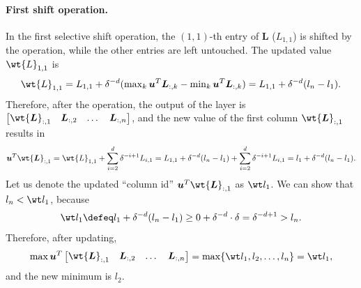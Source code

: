 \documentclass{article} %
\def\vu{{\bm{u}}}
\def\mL{{\bm{L}}}
\def\emL{{L}}
\begin{document}
\paragraph{First shift operation.}
In the first selective shift operation, the $(1,1)$-th entry of $\mL$ ($\emL_{1,1}$) is shifted by the operation, while the other entries are left untouched. The updated value $\wt \emL_{1,1}$ is
\begin{align*}
    \wt \emL_{1,1} 
    = \emL_{1,1} + \delta^{-d} (\max\nolimits_k \vu^T \mL_{:,k} - \min\nolimits_k \vu^T \mL_{:,k}) 
    = \emL_{1,1} + \delta^{-d} (l_n - l_1).
\end{align*}
Therefore, after the operation, the output of the layer is $\begin{bmatrix} \wt \mL_{:,1} & \mL_{:,2} & \dots & \mL_{:,n} \end{bmatrix}$, and the new value of the first column $\wt \mL_{:,1}$ results in
\begin{align*}
    \vu^T \wt \mL_{:,1}
    = \wt \emL_{1,1} + \sum_{i=2}^d \delta^{-i+1} \emL_{i,1}
    = \emL_{1,1} + \delta^{-d} (l_n - l_1) + \sum_{i=2}^d \delta^{-i+1} \emL_{i,1}
    = l_1 + \delta^{-d} (l_n - l_1).
\end{align*}
Let us denote the updated ``column id'' $\vu^T \wt \mL_{:,1}$ as $\wt l_1$.
We can show that $l_n < \wt l_1$, because
\begin{align*}
    \wt l_1 \defeq l_1 + \delta^{-d} (l_n - l_1)
    \geq 0 + \delta^{-d} \cdot \delta
    = \delta^{-d + 1} > l_n.
\end{align*}
Therefore, after updating, 
\begin{equation*}
    \max \vu^T \begin{bmatrix} \wt \mL_{:,1} & \mL_{:,2} & \dots & \mL_{:,n} \end{bmatrix}
    = \max \{ \wt l_1, l_2, \dots, l_n \} = \wt l_1,
\end{equation*}
and the new minimum is $l_2$.
\end{document}

